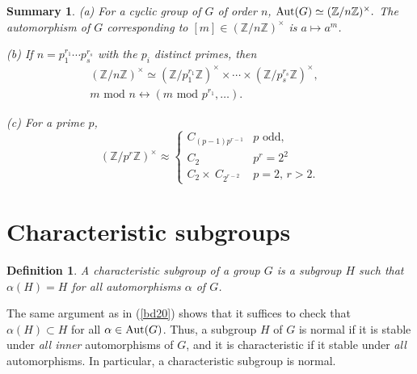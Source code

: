\documentclass[a4paper,11pt,final]{memoir}%
\newtheorem{definition}[X]{Definition}
\newtheorem{summary}[X]{Summary}
\theoremstyle{nonumberplain}
\begin{document}
\begin{summary}
\label{it10}(a) For a cyclic group of $G$ of order $n$, $\operatorname{Aut}(G)\simeq
(\mathbb{Z}{}/n\mathbb{Z}{})^{\times}.$ The automorphism of $G$ corresponding
to $[m]\in(\mathbb{Z}/n\mathbb{Z}{})^{\times}$ is $a\mapsto a^{m}$.

(b) If $n=p_{1}^{r_{1}}\cdots p_{s}^{r_{s}}$ with the $p_{i}$ distinct primes,
then%
\begin{align*}
(\mathbb{Z}/n\mathbb{Z})^{\times}\simeq(\mathbb{Z}/p_{1}^{r_{1}}%
\mathbb{Z})^{\times}\times\cdots\times(\mathbb{Z}/p_{s}^{r_{s}}\mathbb{Z}%
)^{\times},\quad\\
 m\text{ mod }n\leftrightarrow(m\text{ mod }p^{r_{1}}%
,\ldots).
\end{align*}


(c) For a prime $p$,%
\[
(\mathbb{Z}/p^{r}\mathbb{Z})^{\times}\approx%
\begin{cases}
C_{(p-1)p^{r-1}} & p\text{ odd,}\\
C_{2} & p^{r}=2^{2}\\
C_{2}\times\ C_{2^{r-2}} & p=2\text{, }r>2.
\end{cases}
\]

\end{summary}

\section{Characteristic subgroups}

\begin{definition}
\label{it11} A \emph{characteristic subgroup}%
of a group $G$ is a subgroup $H$ such that $\alpha(H)=H$ for all automorphisms
$\alpha$ of $G$.
\end{definition}

The same argument as in (\ref{bd20}) shows that it suffices to check that
$\alpha(H)\subset H$ for all $\alpha\in\operatorname{Aut}(G)$. Thus, a subgroup $H$ of $G$
is normal if it is stable under \textit{all inner} automorphisms of $G$, and
it is characteristic if it stable under \textit{all} automorphisms. In
particular, a characteristic subgroup is normal.
\end{document}
